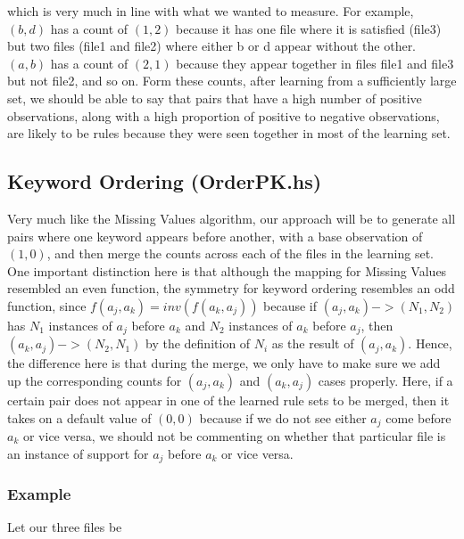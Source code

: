 \documentclass[12pt]{article}
\begin{document}
which is very much in line with what we wanted to measure. For example, $(b,d)$ has a count of $(1,2)$ because it has one file where it is satisfied (file3) but two files (file1 and file2) where either b or d appear without the other. $(a,b)$ has a count of $(2,1)$ because they appear together in files file1 and file3 but not file2, and so on. Form these counts, after learning from a sufficiently large set, we should be able to say that pairs that have a high number of positive observations, along with a high proportion of positive to negative observations, are likely to be rules because they were seen together in most of the learning set.

\subsection{Keyword Ordering (OrderPK.hs)}
Very much like the Missing Values algorithm, our approach will be to generate all pairs where one keyword appears before another, with a base observation of $(1, 0)$, and then merge the counts across each of the files in the learning set. One important distinction here is that although the mapping for Missing Values resembled an even function, the symmetry for keyword ordering resembles an odd function, since $f(a_j, a_k) = inv(f(a_k, a_j))$ because if $(a_j, a_k) -> (N_1, N_2)$ has $N_1$ instances of $a_j$ before $a_k$ and $N_2$ instances of $a_k$ before $a_j$, then $(a_k, a_j) -> (N_2, N_1)$ by the definition of $N_i$ as the result of $(a_j, a_k)$. Hence, the difference here is that during the merge, we only have to make sure we add up the corresponding counts for $(a_j, a_k)$ and $(a_k, a_j)$ cases properly. Here, if a certain pair does not appear in one of the learned rule sets to be merged, then it takes on a default value of $(0, 0)$ because if we do not see either $a_j$ come before $a_k$ or vice versa, we should not be commenting on whether that particular file is an instance of support for $a_j$ before $a_k$ or vice versa.

\subsubsection{Example}
Let our three files be
\end{document}
